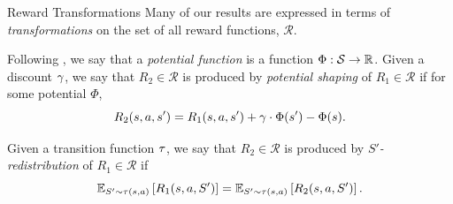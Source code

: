 \documentclass{beamer}
\begin{document}
\begin{frame}{Reward Transformations}
    \small
    Many of our results are expressed in terms of \emph{transformations} on the set of all reward functions, $\mathcal{R}$.
    
    \begin{definition}
    Following \citet{ng1999}, we say that a \emph{potential function} is a function $\Phi : \mathcal{S} \to \mathbb{R}$.
    Given a discount $\gamma$,
    we say that
      $R_2 \in \mathcal{R}$ is produced by \emph{potential shaping} of $R_1 \in \mathcal{R}$
    if for some potential $\Phi$,
      $$
      R_2(s,a,s') = R_1(s,a,s') + \gamma\cdot\Phi(s') - \Phi(s).
      $$
    \end{definition}

    \begin{definition}
    \label{def:sprime-redistribution}
    Given a transition function $\tau$,
    we say that
        $R_2 \in \mathcal{R}$ is produced by \emph{$S'$-redistribution} of $R_1 \in \mathcal{R}$
    if
        $$
        \mathbb{E}_{S' \sim \tau(s,a)}\left[{R_1(s,a,S')}\right]
        = \mathbb{E}_{S' \sim \tau(s,a)}\left[{R_2(s,a,S')}\right].
        $$ 
    \end{definition}
\end{frame}

\end{document}
